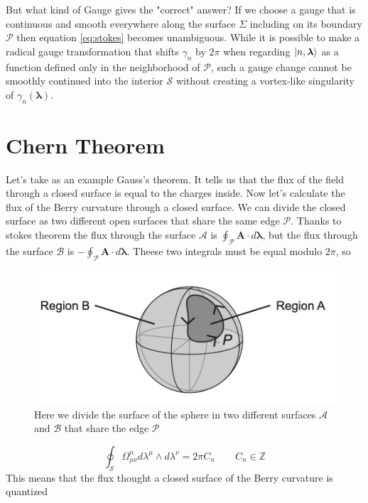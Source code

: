    But what kind of Gauge gives the "correct" answer? If we choose a gauge that is continuous and smooth
    everywhere along the surface $\Sigma$ including on its boundary $\mathcal P$ then equation \ref{eq:stokes} becomes unambiguous.\newline
    While it is possible to make a radical gauge transformation that shifts $\gamma_n$ by $2\pi$ when regarding $\ket{n,\boldsymbol \lambda}$ as a function defined only in the neighborhood of $\mathcal P$, such a gauge change cannot be smoothly continued into the interior $\mathcal S$ without creating a vortex-like singularity of $\gamma_n(\boldsymbol \lambda)$.


\section{Chern Theorem}
    
    Let's take as an example Gauss's theorem. It tells us that the flux of the field through a closed surface is equal to the charges inside. \newline
    Now let's calculate the flux of the Berry curvature through a closed surface. We can divide the closed surface as two different open surfaces that share the same edge $\mathcal P$.\newline
    Thanks to stokes theorem the flux through the surface $\mathcal A$ is $\oint_\mathcal{P} \mathbf A \cdot d\boldsymbol \lambda$, but the flux through the surface $\mathcal B$ is $-\oint_\mathcal{P} \mathbf A \cdot d\boldsymbol \lambda$.\newline
    Theese two integrals must be equal modulo $2\pi$, so
    \begin{figure}
        \centering
        \includegraphics[width=0.85\linewidth]{Immagini/topo/chern_theorem.png}
        \caption{Here we divide the surface of the sphere in two different surfaces $\mathcal A$ and $\mathcal B$ that share the edge $\mathcal P$}
        \label{fig:forward_pass}
    \end{figure}
    \begin{equation}
        \label{eq:chern}
        \oint_\mathcal{S} \Omega_{\mu\nu}^n d\lambda^\mu \wedge d\lambda^\nu =2\pi C_n \quad\quad C_n\in \mathbb Z
    \end{equation}
    This means that the flux thought a closed surface of the Berry curvature is quantized
    
